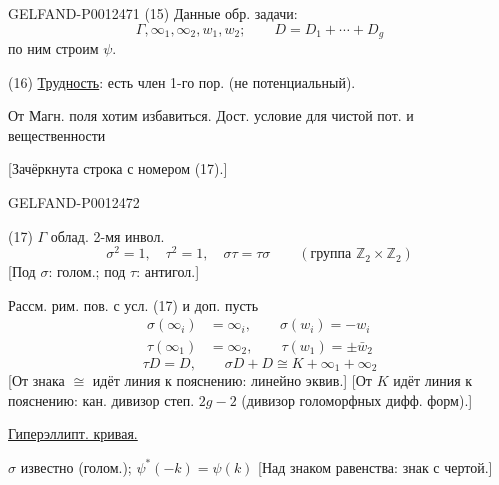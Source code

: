 \begin{GelfandAdjacentEvidence}{GELFAND-P001247}{1}
(15) Данные обр. задачи:
\begin{equation*}
\Gamma,\infty_1,\infty_2,w_1,w_2;\qquad D=D_1+\cdots+D_g
\end{equation*}
по ним строим $\psi$.

(16) \underline{Трудность}: есть член 1-го пор. (не потенциальный).

От Магн. поля хотим избавиться. Дост. условие для чистой пот. и вещественности

[Зачёркнута строка с номером (17).]
\end{GelfandAdjacentEvidence}
\begin{GelfandAdjacentEvidence}{GELFAND-P001247}{2}


(17) $\Gamma$ облад. 2-мя инвол.
\begin{equation*}
\sigma^2=1,\quad\tau^2=1,\quad\sigma\tau=\tau\sigma
\qquad(\text{группа }\mathbb Z_2\times\mathbb Z_2)
\end{equation*}
[Под $\sigma$: голом.; под $\tau$: антигол.]

Рассм. рим. пов. с усл. (17) и доп. пусть
\begin{equation*}
\begin{aligned}
\sigma(\infty_i)&=\infty_i,\qquad\sigma(w_i)=-w_i\\
\tau(\infty_1)&=\infty_2,\qquad\tau(w_1)=\pm\bar w_2
\end{aligned}\tag{18}
\end{equation*}
\begin{equation*}
\tau D=D,\qquad\sigma D+D\cong K+\infty_1+\infty_2\tag{19}
\end{equation*}
[От знака $\cong$ идёт линия к пояснению: линейно эквив.]
[От $K$ идёт линия к пояснению: кан. дивизор степ. $2g-2$ (дивизор голоморфных дифф. форм).]

\underline{Гиперэллипт. кривая.}

$\sigma$ известно (голом.); $\psi^*(-k)=\psi(k)$ [Над знаком равенства: знак с чертой.]
\end{GelfandAdjacentEvidence}
